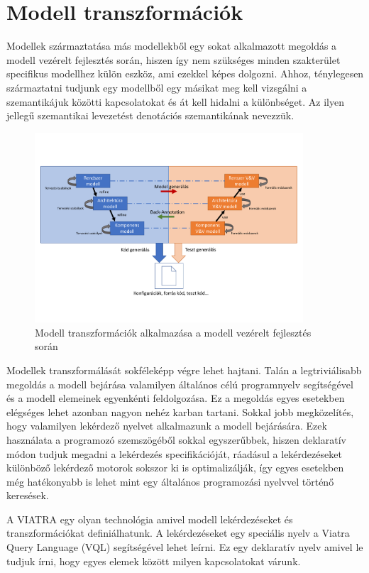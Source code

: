 \section{Modell transzformációk}

Modellek származtatása más modellekből egy sokat alkalmazott megoldás a modell vezérelt fejlesztés során, hiszen így nem szükséges minden szakterület specifikus modellhez külön eszköz, ami ezekkel képes dolgozni. Ahhoz, ténylegesen származtatni tudjunk egy modellből egy másikat meg kell vizsgálni a szemantikájuk közötti kapcsolatokat és át kell hidalni a különbséget. Az ilyen jellegű szemantikai levezetést denotációs szemantikának nevezzük.

\begin{figure}[!ht]
	\centering
	\includegraphics[width=100mm, keepaspectratio]{figures/Vmodel.pdf}
	\caption{Modell transzformációk alkalmazása a modell vezérelt fejlesztés során}
	\label{fig:concept}
\end{figure}

Modellek transzformálását sokféleképp végre lehet hajtani. Talán a legtriviálisabb megoldás a modell bejárása valamilyen általános célú programnyelv segítségével és a modell elemeinek egyenkénti feldolgozása. Ez a megoldás egyes esetekben elégséges lehet azonban nagyon nehéz karban tartani. Sokkal jobb megközelítés, hogy valamilyen lekérdező nyelvet alkalmazunk a modell bejárására. Ezek használata a programozó szemszögéből sokkal egyszerűbbek, hiszen deklaratív módon tudjuk megadni a lekérdezés specifikációját, ráadásul a lekérdezéseket különböző lekérdező motorok sokszor ki is optimalizálják, így egyes esetekben még hatékonyabb is lehet mint egy általános programozási nyelvvel történő keresések.

A VIATRA egy olyan technológia amivel modell lekérdezéseket és transzformációkat definiálhatunk. A lekérdezéseket egy speciális nyelv a Viatra Query Language (VQL) segítségével lehet leírni. Ez egy deklaratív nyelv amivel le tudjuk írni, hogy egyes elemek között milyen kapcsolatokat várunk.

